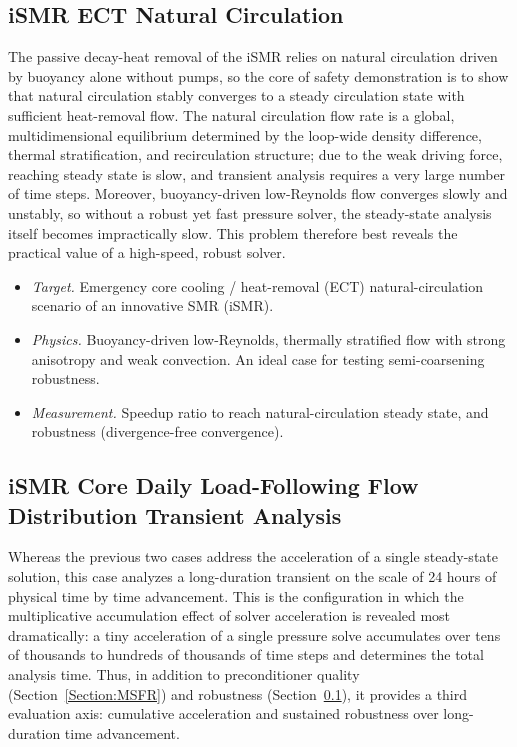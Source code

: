 \documentclass[review]{elsarticle}
\begin{document}
\subsection{iSMR ECT Natural Circulation}
\label{Section:iSMRnc}
The passive decay-heat removal of the iSMR relies on natural circulation driven by buoyancy alone without pumps, so the core of safety demonstration is to show that natural circulation stably converges to a steady circulation state with sufficient heat-removal flow. The natural circulation flow rate is a global, multidimensional equilibrium determined by the loop-wide density difference, thermal stratification, and recirculation structure; due to the weak driving force, reaching steady state is slow, and transient analysis requires a very large number of time steps. Moreover, buoyancy-driven low-Reynolds flow converges slowly and unstably, so without a robust yet fast pressure solver, the steady-state analysis itself becomes impractically slow. This problem therefore best reveals the practical value of a high-speed, robust solver.
\begin{itemize}
  \item \emph{Target.} Emergency core cooling / heat-removal (ECT) natural-circulation scenario of an innovative SMR (iSMR).
  \item \emph{Physics.} Buoyancy-driven low-Reynolds, thermally stratified flow with strong anisotropy and weak convection. An ideal case for testing semi-coarsening robustness.
  \item \emph{Measurement.} Speedup ratio to reach natural-circulation steady state, and robustness (divergence-free convergence).
\end{itemize}

\subsection{iSMR Core Daily Load-Following Flow Distribution Transient Analysis}
\label{Section:iSMRtrans}
Whereas the previous two cases address the acceleration of a single steady-state solution, this case analyzes a long-duration transient on the scale of 24 hours of physical time by time advancement. This is the configuration in which the multiplicative accumulation effect of solver acceleration is revealed most dramatically: a tiny acceleration of a single pressure solve accumulates over tens of thousands to hundreds of thousands of time steps and determines the total analysis time. Thus, in addition to preconditioner quality (Section~\ref{Section:MSFR}) and robustness (Section~\ref{Section:iSMRnc}), it provides a third evaluation axis: cumulative acceleration and sustained robustness over long-duration time advancement.
\end{document}

